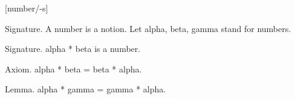 [number/-s]

Signature. A number is a notion.
Let alpha, beta, gamma stand for numbers.

Signature. alpha * beta is a number.

Axiom. alpha * beta = beta * alpha.

Lemma. alpha * gamma = gamma * alpha.
